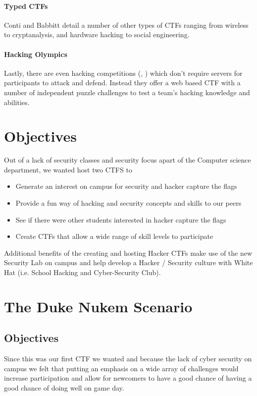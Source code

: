 \documentclass[10pt]{article}
\begin{document}
\paragraph*{Typed CTFs} Conti and Babbitt
\cite{HackingCompetitionsForSecurityEducation} detail a number of other types
of CTFs ranging from wireless to cryptanalysis, and hardware hacking to social
engineering.

\paragraph*{Hacking Olympics} Lastly, there are even hacking competitions
(\cite{Cipher}, \cite{SMPCTF}) which don't require servers for participants to
attack and defend. Instead they offer a web based CTF with a number of
independent puzzle challenges to test a team's hacking knowledge and abilities.

\section{Objectives}
Out of a lack of security classes and security focus apart of the Computer science
department, we wanted host two CTFS to

\begin{itemize}
\item Generate an interest on campus for security and hacker capture the flags
\item Provide a fun way  of hacking and security concepts and skills to our peers
\item See if there were other students interested in hacker capture the flags
\item Create CTFs that allow a wide range of skill levels to participate
\end{itemize}

Additional benefits of the creating and hosting Hacker CTFs make use of the new
Security Lab on campus and help develop a Hacker / Security culture with White
Hat (i.e. School Hacking and Cyber-Security Club).

\section{The Duke Nukem Scenario}

\subsection{Objectives}
Since this was our first CTF we wanted and because the lack of cyber security
on campus we felt that putting an emphasis on a wide array of challenges
would increase participation and allow for newcomers to have a good chance of 
having a good chance of doing well on game day.
\end{document}
